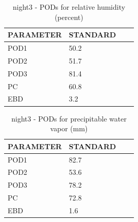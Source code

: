 \begin{table}[p!]
\begin{center}
\begin{tabular}{|l|l|l|l|}
\hline
\multicolumn{1}{|c|}{\cellcolor[HTML]{C0C0C0}\textbf{PARAMETER}} & \multicolumn{1}{c|}{\cellcolor[HTML]{C0C0C0}\textbf{STANDARD}} \\
\hline
\cellcolor[HTML]{C0C0C0}POD1  & 50.2                                \\
\cellcolor[HTML]{C0C0C0}POD2  & 51.7                                \\
\cellcolor[HTML]{C0C0C0}POD3  & 81.4                                \\
\cellcolor[HTML]{C0C0C0}PC    & 60.8                                  \\
\cellcolor[HTML]{C0C0C0}EBD   & 3.2                                 \\
\hline
\end{tabular}
\caption{night3 - PODs for relative humidity (percent)}
\label{tab:podrh:night3}
\end{center}
\end{table}
\begin{table}[p!]
\begin{center}
\begin{tabular}{|l|l|l|l|}
\hline
\multicolumn{1}{|c|}{\cellcolor[HTML]{C0C0C0}\textbf{PARAMETER}} & \multicolumn{1}{c|}{\cellcolor[HTML]{C0C0C0}\textbf{STANDARD}} \\
\hline
\cellcolor[HTML]{C0C0C0}POD1  & 82.7                                \\
\cellcolor[HTML]{C0C0C0}POD2  & 53.6                                \\
\cellcolor[HTML]{C0C0C0}POD3  & 78.2                                \\
\cellcolor[HTML]{C0C0C0}PC    & 72.8                                  \\
\cellcolor[HTML]{C0C0C0}EBD   & 1.6                                 \\
\hline
\end{tabular}
\caption{night3 - PODs for precipitable water vapor (mm)}
\label{tab:podpwv:night3}
\end{center}
\end{table}
